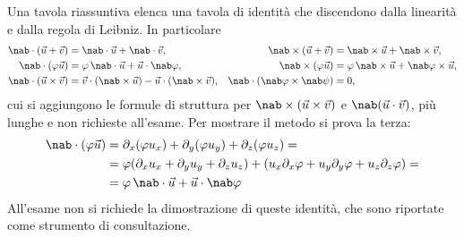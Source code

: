 \documentclass[main.tex]{subfiles}
\begin{document}
Una tavola riassuntiva elenca una tavola di identità che discendono dalla linearità e dalla regola di Leibniz. In particolare
\begin{align*}
\nab\cdot(\vec u+\vec v)&=\nab\cdot\vec u+\nab\cdot\vec v, &
\nab\times(\vec u+\vec v)&=\nab\times\vec u+\nab\times\vec v,\\
\nab\cdot(\varphi\vec u)&=\varphi\,\nab\cdot\vec u+\vec u\cdot\nab\varphi, &
\nab\times(\varphi\vec u)&=\varphi\,\nab\times\vec u+\nab\varphi\times\vec u,\\
\nab\cdot(\vec u\times\vec v)&=\vec v\cdot(\nab\times\vec u)-\vec u\cdot(\nab\times\vec v), &
\nab\cdot(\nab\varphi\times\nab\psi)&=0 ,
\end{align*}
cui si aggiungono le formule di struttura per $\nab\times(\vec u\times\vec v)$ e $\nab(\vec u\cdot\vec v)$, più lunghe e non richieste all'esame. Per mostrare il metodo si prova la terza: 
\begin{align*} 
\nab\cdot(\varphi\vec u)&=\partial_x(\varphi u_x)+\partial_y(\varphi u_y)+\partial_z(\varphi u_z)= \\
&=\varphi(\partial_xu_x+\partial_yu_y+\partial_zu_z)+(u_x\partial_x\varphi+u_y\partial_y\varphi+u_z\partial_z\varphi)=\\
&=\varphi\,\nab\cdot\vec u+\vec u\cdot\nab\varphi 
\end{align*}
All'esame non si richiede la dimostrazione di queste identità, che sono riportate come strumento di consultazione.
\end{document}
